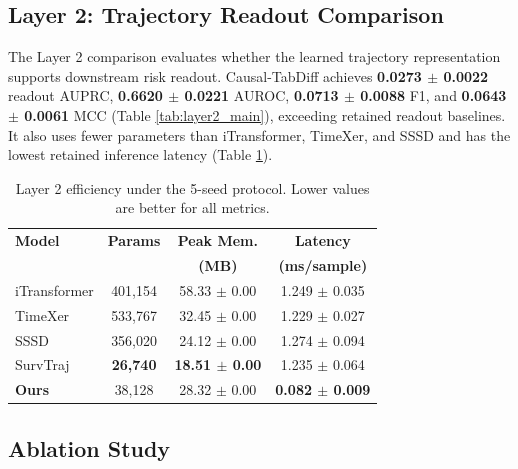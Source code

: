 \documentclass[11pt,journal,twoside]{IEEEtran}
\begin{document}
\subsection{Layer 2: Trajectory Readout Comparison}
\label{subsec:layer2_results}

The Layer 2 comparison evaluates whether the learned trajectory representation supports downstream risk readout. Causal-TabDiff achieves \textbf{0.0273 $\pm$ 0.0022} readout AUPRC, \textbf{0.6620 $\pm$ 0.0221} AUROC, \textbf{0.0713 $\pm$ 0.0088} F1, and \textbf{0.0643 $\pm$ 0.0061} MCC (Table \ref{tab:layer2_main}), exceeding retained readout baselines. It also uses fewer parameters than iTransformer, TimeXer, and SSSD and has the lowest retained inference latency (Table \ref{tab:efficiency}).

\begin{table}[!htbp]
\caption{Layer 2 trajectory-to-risk readout performance on the held-out test set. Results are mean $\pm$ std over 5 seeds.}
\label{tab:layer2_main}
\centering
\scriptsize
\setlength{\tabcolsep}{2pt}
\resizebox{\columnwidth}{!}{}
\end{table}

\begin{table}[!htbp]
\caption{Layer 2 efficiency under the 5-seed protocol. Lower values are better for all metrics.}
\label{tab:efficiency}
\centering
\footnotesize
\begin{tabular}{lccc}
\toprule
\textbf{Model} & \textbf{Params} & \textbf{Peak Mem.} & \textbf{Latency} \\
 & & \textbf{(MB)} & \textbf{(ms/sample)} \\
\midrule
iTransformer & 401,154 & 58.33 $\pm$ 0.00 & 1.249 $\pm$ 0.035 \\
TimeXer & 533,767 & 32.45 $\pm$ 0.00 & 1.229 $\pm$ 0.027 \\
SSSD & 356,020 & 24.12 $\pm$ 0.00 & 1.274 $\pm$ 0.094 \\
SurvTraj & \textbf{26,740} & \textbf{18.51 $\pm$ 0.00} & 1.235 $\pm$ 0.064 \\
\textbf{Ours} & 38,128 & 28.32 $\pm$ 0.00 & \textbf{0.082 $\pm$ 0.009} \\
\bottomrule
\end{tabular}
\end{table}

\subsection{Ablation Study}
\label{subsec:ablation}
\end{document}

